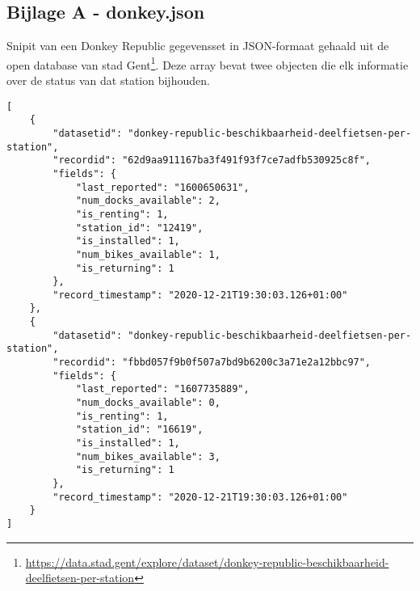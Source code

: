 \begin{appendices}
\section*{Bijlage A - donkey.json}
\label{app:donkey.json}
Snipit van een Donkey Republic gegevensset in JSON-formaat gehaald uit de open database van stad Gent\footnote{\url{https://data.stad.gent/explore/dataset/donkey-republic-beschikbaarheid-deelfietsen-per-station}}. Deze array bevat twee objecten die elk informatie over de status van dat station bijhouden.
\begin{code}
\begin{verbatim}
[
    {
        "datasetid": "donkey-republic-beschikbaarheid-deelfietsen-per-station",
        "recordid": "62d9aa911167ba3f491f93f7ce7adfb530925c8f",
        "fields": {
            "last_reported": "1600650631",
            "num_docks_available": 2,
            "is_renting": 1,
            "station_id": "12419",
            "is_installed": 1,
            "num_bikes_available": 1,
            "is_returning": 1
        },
        "record_timestamp": "2020-12-21T19:30:03.126+01:00"
    },
    {
        "datasetid": "donkey-republic-beschikbaarheid-deelfietsen-per-station",
        "recordid": "fbbd057f9b0f507a7bd9b6200c3a71e2a12bbc97",
        "fields": {
            "last_reported": "1607735889",
            "num_docks_available": 0,
            "is_renting": 1,
            "station_id": "16619",
            "is_installed": 1,
            "num_bikes_available": 3,
            "is_returning": 1
        },
        "record_timestamp": "2020-12-21T19:30:03.126+01:00"
    }
]
\end{verbatim}
\end{code}


\end{appendices}

